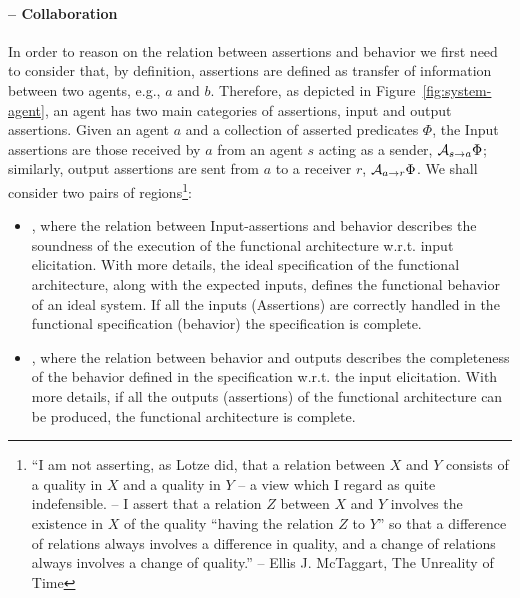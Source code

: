 \paragraph{\Rcc{$\assertionRegion$}{$\behaviorRegion$} -- Collaboration}
In order to reason on the relation between assertions and behavior we first
need to consider that, by definition, assertions are defined as transfer of
information between two agents, e.g., $a$ and $b$.  Therefore, as depicted in
Figure~\ref{fig:system-agent}, an agent has two main categories of assertions,
input and output assertions.  Given an agent $a$ and a collection of asserted
predicates $\Phi$, the Input assertions are those received by $a$ from an agent
$s$ acting as a sender, $\mathcal{A}_{s\rightarrow a}\Phi$; similarly, output assertions
are sent from $a$ to a receiver $r$, $\mathcal{A}_{a\rightarrow r}\Phi$. We shall consider
two pairs of regions\footnote{``I am not asserting, as Lotze did, that a relation between $X$ and $Y$
consists of a quality in $X$ and a quality in $Y$ -- a view which I regard as
quite indefensible. -- I assert that a relation $Z$ between $X$ and $Y$ involves
the existence in $X$ of the quality ``having the relation $Z$ to $Y$'' so that
a difference of relations always involves a difference in quality, and a
change of relations always involves a change of quality.'' --  Ellis J. McTaggart, The Unreality of Time\autocite{Mctaggart1908unreality}}: 
\begin{itemize}
	\item {},
		where the relation between Input-assertions and behavior
		describes the soundness of the execution of the functional
		architecture w.r.t. input elicitation. With more details, the
		ideal specification of the functional architecture, along with
		the expected inputs, defines the functional behavior of an
		ideal system.  If all the inputs (Assertions) are correctly
		handled in the functional specification (behavior) the
		specification is complete. 

	\item {},
		where the relation between behavior and outputs describes the
		completeness of the behavior defined in the specification
		w.r.t. the input elicitation.  With more details, if all the
		outputs (assertions) of the functional architecture can be
		produced, the functional architecture is complete.
\end{itemize}


